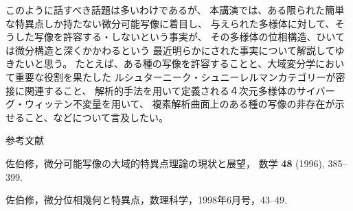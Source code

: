 \documentclass[uplatex,dvipdfmx]{jlreq}
\begin{document}
このように話すべき話題は多いわけであるが、
本講演では、ある限られた簡単な特異点しか持たない微分可能写像に着目し、
与えられた多様体に対して、そうした写像を許容する・しないという事実が、
その多様体の位相構造、ひいては微分構造と深くかかわるという
最近明らかにされた事実について解説してゆきたいと思う。
たとえば、ある種の写像を許容することと、大域変分学において重要な役割を果たした
ルシュターニーク・シュニーレルマンカテゴリーが密接に関連すること、
解析的手法を用いて定義される４次元多様体のサイバーグ・ウィッテン不変量を用いて、
複素解析曲面上のある種の写像の非存在が示せること、などについて言及したい。

\begin{center}\textsc{参考文献}\end{center}

\begin{enumerate}[{[1]}]
  \setlength{\itemsep}{3pt}
  \item[{[1]}] 佐伯修，微分可能写像の大域的特異点理論の現状と展望，
        数学 \textbf{48} (1996), 385--399.
  \item[{[2]}] 佐伯修，微分位相幾何と特異点，数理科学，1998年6月号，43--49.
\end{enumerate}
\end{document}
